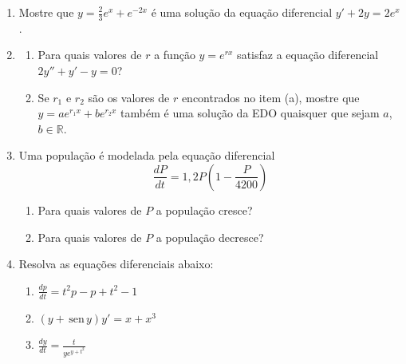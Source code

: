 \documentclass[a4paper,5pt]{amsbook}
\newcommand{\sen}{\,\mbox{sen}\,}
\newcommand{\ds}{\displaystyle}
\begin{document}
\vspace{1cm}
\begin{enumerate}
	\vspace{0.5cm}
    \item Mostre que $y=\frac{2}{3}e^x + e^{-2x}$ \'e uma solu\c{c}\~ao da equa\c{c}\~ao
        diferencial $y'+2y=2e^x$.

	\vspace{0.5cm}
    \item
        \begin{enumerate}
            \item Para quais valores de $r$ a fun\c{c}\~ao $y=e^{rx}$ satisfaz a
                equa\c{c}\~ao diferencial $2y''+y'-y=0$?
            \vspace{0.3cm}
            \item Se $r_1$ e $r_2$ s\~ao os valores de $r$ encontrados no item
                (a), mostre que $y=ae^{r_1 x} + be^{r_2 x}$ tamb\'em \'e uma
                solu\c{c}\~ao da EDO quaisquer que sejam $a$, $b\in\mathbb{R}$.
        \end{enumerate}

	\vspace{0.5cm}
    \item Uma popula\c{c}\~ao \'e modelada pela equa\c{c}\~ao diferencial
        \[\frac{dP}{dt}=1,2P\left(1-\frac{P}{4200}\right)\]
        \begin{enumerate}
            \item Para quais valores de $P$ a popula\c{c}\~ao cresce?
            \item Para quais valores de $P$ a popula\c{c}\~ao decresce?
        \end{enumerate}

	\vspace{0.5cm}
    \item Resolva as equa\c{c}\~oes diferenciais abaixo:
        \begin{enumerate}
            \vspace{0.3cm}
            \item $\ds\frac{dp}{dt}=t^2p-p+t^2-1$
            \vspace{0.3cm}
            \item $\ds(y+\sen y)y'=x+x^3$
            \vspace{0.3cm}
            \item $\ds\frac{dy}{dt}=\frac{t}{ye^{y+t^2}}$
        \end{enumerate}


\end{enumerate}
\end{document}
